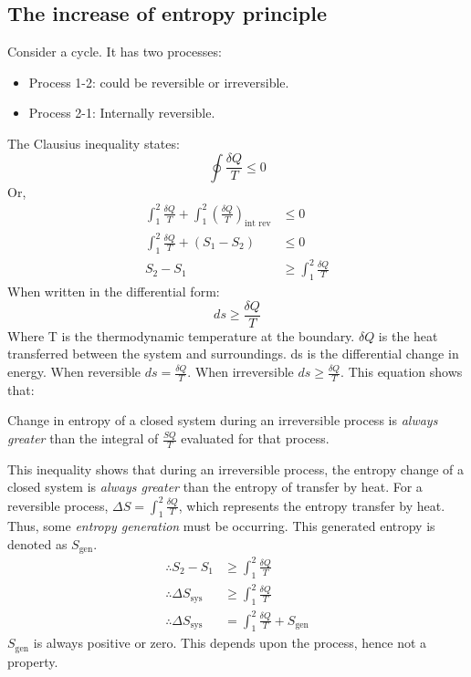 \subsection{The increase of entropy principle}
Consider a cycle. It has two processes:
\begin{itemize}[noitemsep]
  \item Process 1-2: could be reversible or irreversible.
  \item Process 2-1: Internally reversible.
\end{itemize}
The Clausius inequality states:
\begin{equation}
  \oint \frac{\delta Q}{T} \leq 0
\end{equation}
Or,
\begin{align}
  \int_1^2 \frac{\delta Q}{T} + \int_1^2\left( \frac{\delta Q}{T} \right)_{\textrm{int rev}} & \leq 0                           \\
  \int_1^2 \frac{\delta Q}{T} + (S_1 - S_2)                                                  & \leq 0                           \\
  S_2 - S_1                                                                                  & \geq \int_1^2 \frac{\delta Q}{T}
\end{align}
When written in the differential form:
\begin{equation}
  ds \geq \frac{\delta Q}{T}
\end{equation}
Where T is the thermodynamic temperature at the boundary. \( \delta Q \) is the heat transferred between the system and surroundings. ds is the differential change in energy. When reversible \( ds = \frac{\delta Q}{T} \). When irreversible \( ds \geq \frac{\delta Q}{T} \). This equation shows that:
\begin{center}
  Change in entropy of a closed system during an irreversible process is \emph{always greater} than the integral of \(\frac{SQ}{T}\) evaluated for that process.
\end{center}
This inequality shows that during an irreversible process, the entropy  change of a closed system is \emph{always greater} than the entropy of transfer by heat. For a reversible process, \( \Delta S = \int_1^2 \frac{\delta Q}{T} \), which represents the entropy transfer by heat. Thus, some \emph{entropy generation} must be occurring. This generated entropy is denoted as \(S_{\textrm{gen}}\).
\begin{align}
  \therefore S_2 - S_1               & \geq \int_1^2 \frac{\delta Q}{T}                 \\
  \therefore \Delta S_{\textrm{sys}} & \geq \int_1^2 \frac{\delta Q}{T}                 \\
  \therefore \Delta S_{\textrm{sys}} & = \int_1^2 \frac{\delta Q}{T} + S_{\textrm{gen}}
\end{align}
\( S_{\textrm{gen}} \) is always positive or zero. This depends upon the process, hence not a property.

